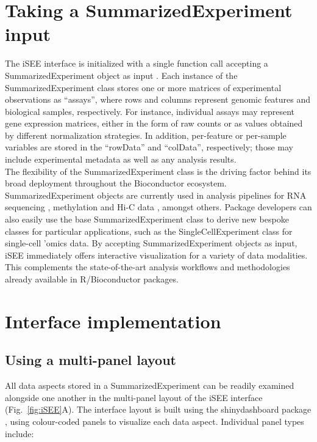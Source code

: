 \documentclass[10pt,a4paper,twocolumn]{article}
\begin{document}
\section*{Taking a SummarizedExperiment input}
The iSEE interface is initialized with a single function call accepting a SummarizedExperiment object as input \citep{huber2015orchestrating}.
Each instance of the SummarizedExperiment class stores one or more matrices of experimental observations as ``assays'', where rows and columns represent genomic features and biological samples, respectively.
For instance, individual assays may represent gene expression matrices, either in the form of raw counts or as values obtained by different normalization strategies.
In addition, per-feature or per-sample variables are stored in the ``rowData'' and ``colData'', respectively; those may include experimental metadata as well as any analysis results.\\

The flexibility of the SummarizedExperiment class is the driving factor behind its broad deployment throughout the Bioconductor ecosystem.
SummarizedExperiment objects are currently used in analysis pipelines for RNA sequencing \citep{love2014moderated}, methylation \citep{aryee2014minfi} and Hi-C data \citep{lun2016infrastructure}, amongst others.
Package developers can also easily use the base SummarizedExperiment class to derive new bespoke classes for particular applications, such as the SingleCellExperiment class for single-cell 'omics data.
By accepting SummarizedExperiment objects as input, iSEE immediately offers interactive visualization for a variety of data modalities.
This complements the state-of-the-art analysis workflows and methodologies already available in R/Bioconductor packages. \\

\section*{Interface implementation}

\subsection*{Using a multi-panel layout}
All data aspects stored in a SummarizedExperiment can be readily examined alongside one another in the multi-panel layout of the iSEE interface (Fig.~\ref{fig:iSEE}A).
The interface layout is built using the shinydashboard package \citep{chang2018shinydashboard}, using colour-coded panels to visualize each data aspect.
Individual panel types include:
\end{document}

